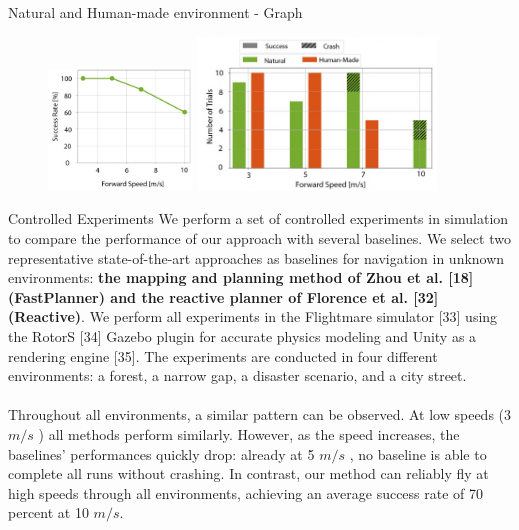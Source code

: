 \documentclass{beamer}
\begin{document}
\begin{frame}{Natural and Human-made environment - Graph }
	\begin{figure}
		\includegraphics[width=1.5in]{images/natural-human-linegraph.png}
		\includegraphics[width=2.5in]{images/natural-human-bargraph.png}
	\end{figure}
\end{frame}

\begin{frame}{Controlled Experiments}
	We perform a set of controlled experiments in simulation to compare the performance of our approach with several baselines. We select two representative state-of-the-art approaches as baselines for navigation in unknown environments: \textbf{the mapping and planning method of Zhou et al. [18] (FastPlanner) and the reactive planner of Florence et al. [32] (Reactive)}.  We perform all experiments in the Flightmare simulator [33] using the RotorS [34] Gazebo plugin for accurate physics modeling and Unity as a rendering engine [35]. The experiments are conducted in four different environments: a forest, a narrow gap, a disaster scenario, and a city street.  \\~\\
	
	Throughout all environments, a similar pattern can be observed. At low speeds (3 $m/s$ ) all methods perform similarly. However, as the speed increases, the baselines’ performances quickly drop: already at 5 $m/s$ , no baseline is able to complete all runs without crashing. In contrast, our method can reliably fly at high speeds through all environments, achieving an average success rate of 70 percent at 10 $m/s$. 
\end{frame}
\end{document}
